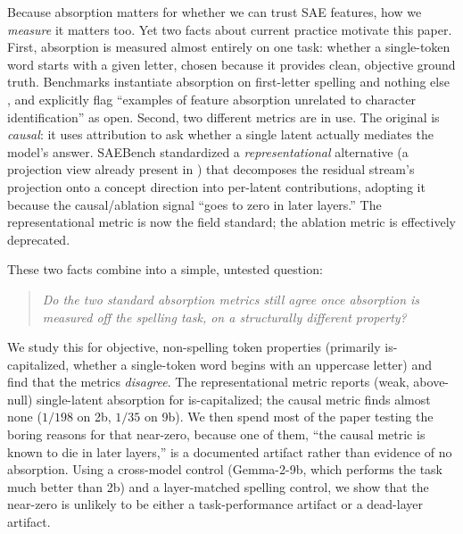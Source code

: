 \documentclass[11pt]{article}
\newcommand{\iscap}{\textsf{is-capitalized}}
\theoremstyle{definition}
\begin{document}
Because absorption matters for whether we can trust SAE features, how we \emph{measure} it matters too. Yet
two facts about current practice motivate this paper. First, absorption is measured almost entirely on one
task: whether a single-token word starts with a given letter, chosen because it provides clean, objective
ground truth. Benchmarks instantiate absorption on first-letter spelling and nothing else
\citep{karvonen2025saebench}, and \citet{chanin2024absorption} explicitly flag ``examples of feature
absorption unrelated to character identification'' as open. Second, two different metrics are in use. The
original \citep{chanin2024absorption} is \emph{causal}: it uses attribution to ask whether a single latent
actually mediates the model's answer. SAEBench \citep{karvonen2025saebench} standardized a
\emph{representational} alternative (a projection view already present in \citet{chanin2024absorption})
that decomposes the residual stream's projection onto a concept
direction into per-latent contributions, adopting it because the causal/ablation signal ``goes to zero in
later layers.'' The representational metric is now the field standard; the ablation metric is effectively
deprecated.

These two facts combine into a simple, untested question:
\begin{quote}
\itshape Do the two standard absorption metrics still agree once absorption is measured off the spelling
task, on a structurally different property?
\end{quote}
We study this for objective, non-spelling token properties (primarily \iscap{}, whether a single-token
word begins with an uppercase letter) and find that the metrics \emph{disagree}. The representational
metric reports (weak, above-null) single-latent absorption for \iscap{}; the causal metric finds almost
none ($1/198$ on 2b, $1/35$ on 9b). We then spend most of the paper testing the boring reasons for that
near-zero, because one of them,
``the causal metric is known to die in later layers,'' is a documented artifact rather than evidence of
no absorption. Using a cross-model control (Gemma-2-9b, which performs the task much better than 2b) and a
layer-matched spelling control, we show that the near-zero is unlikely to be either a task-performance
artifact or a dead-layer artifact.
\end{document}

